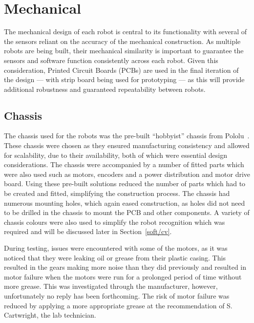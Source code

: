 
\chapter{Mechanical}\label{mechanical}

The mechanical design of each robot is central to its 
functionality with several of the sensors
reliant on the accuracy of the mechanical construction. As 
multiple robots are being built, 
their mechanical similarity is important to guarantee the 
sensors and software function consistently across each robot. 
Given this consideration, Printed Circuit Boards (PCBs) are used in 
the final iteration of the design --- with strip board being used for 
prototyping --- as this will provide additional robustness and 
guaranteed repeatability between robots.

\section{Chassis}\label{mech/chassis}
The chassis used for the robots was the pre-built ``hobbyist'' 
chassis from Pololu~\cite{pololuchassis}. These chassis were 
chosen as they ensured manufacturing  consistency and allowed 
for scalability, due to their availability, both of which were 
essential design considerations. The chassis were accompanied by 
a number of fitted parts which were also used such as motors, 
encoders and a power distribution and motor drive board. Using these pre-built 
solutions reduced the number of parts which had to be created 
and fitted, simplifying the construction process.
The chassis had numerous mounting holes, which again eased 
construction, as holes did not need to be drilled in the chassis 
to mount the PCB and other components. A variety of chassis 
colours were also used to simplify the robot recognition which 
was required and will be discussed later in Section~\ref{soft/cv}. 

During testing, issues were encountered with some of the motors, 
as it was noticed that they 
were leaking oil or grease from their plastic casing. This 
resulted in the gears making more noise than they did previously 
and resulted in motor failure when the motors were run for a 
prolonged period of time without more grease. This was 
investigated through the manufacturer, however, unfortunately no 
reply has been forthcoming. The risk of motor failure was 
reduced by applying a more appropriate grease at the 
recommendation of S. Cartwright, the lab technician.  

